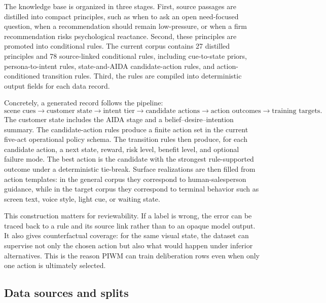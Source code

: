 The knowledge base is organized in three stages. First, source passages are distilled into compact principles, such as when to ask an open need-focused question, when a recommendation should remain low-pressure, or when a firm recommendation risks psychological reactance. Second, these principles are promoted into conditional rules. The current corpus contains 27 distilled principles and 78 source-linked conditional rules, including cue-to-state priors, persona-to-intent rules, state-and-AIDA candidate-action rules, and action-conditioned transition rules. Third, the rules are compiled into deterministic output fields for each data record.

Concretely, a generated record follows the pipeline:
\[
\text{scene cues} \rightarrow
\text{customer state} \rightarrow
\text{intent tier} \rightarrow
\text{candidate actions} \rightarrow
\text{action outcomes} \rightarrow
\text{training targets}.
\]
The customer state includes the AIDA stage and a belief--desire--intention summary. The candidate-action rules produce a finite action set in the current five-act operational policy schema. The transition rules then produce, for each candidate action, a next state, reward, risk level, benefit level, and optional failure mode. The best action is the candidate with the strongest rule-supported outcome under a deterministic tie-break. Surface realizations are then filled from action templates: in the general corpus they correspond to human-salesperson guidance, while in the target corpus they correspond to terminal behavior such as screen text, voice style, light cue, or waiting state.

This construction matters for reviewability. If a label is wrong, the error can be traced back to a rule and its source link rather than to an opaque model output. It also gives counterfactual coverage: for the same visual state, the dataset can supervise not only the chosen action but also what would happen under inferior alternatives. This is the reason PIWM can train deliberation rows even when only one action is ultimately selected.

\subsection{Data sources and splits}

